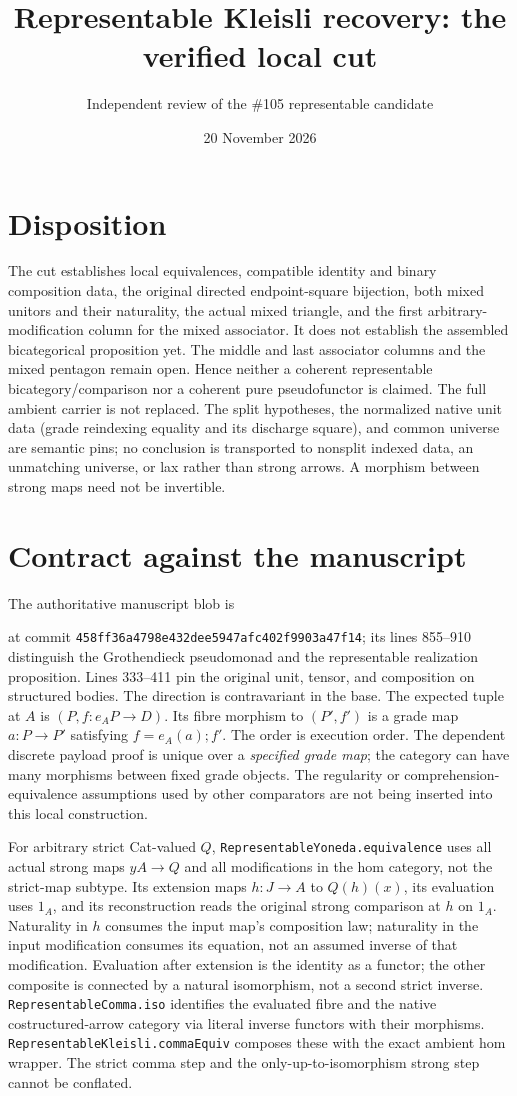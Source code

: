 \documentclass[11pt]{article}
\title{Representable Kleisli recovery: the verified local cut}
\author{Independent review of the \#105 representable candidate}
\date{20 November 2026}
\newcommand{\nm}[1]{\nolinkurl{#1}}
\newcommand{\hash}[1]{\par\noindent{\footnotesize\ttfamily #1}\par}
\begin{document}
\maketitle
\section*{Disposition}
The cut establishes local equivalences, compatible identity and binary
composition data, the original directed endpoint-square bijection,
both mixed unitors and their naturality, the actual mixed triangle, and
the first arbitrary-modification column for the mixed associator. It does
not establish the assembled bicategorical proposition yet. The middle and
last associator columns and the mixed pentagon remain open. Hence neither
a coherent representable bicategory/comparison nor a coherent pure
pseudofunctor is claimed. The full ambient carrier is not replaced.
The split hypotheses, the normalized native unit data (grade reindexing equality and its discharge square), and common universe are semantic pins; no conclusion
is transported to nonsplit indexed data, an unmatching universe, or
lax rather than strong arrows. A morphism between strong maps need not
be invertible.

\section*{Contract against the manuscript}
The authoritative manuscript blob is
\hash{b1e84592f59558c851faabb5291d7392d2b2f908}
at commit \nm{458ff36a4798e432dee5947afc402f9903a47f14}; its lines
855--910 distinguish the Grothendieck pseudomonad and the representable
realization proposition. Lines 333--411 pin the original unit, tensor,
and composition on structured bodies. The direction is contravariant in the base.
The expected tuple at $A$ is $(P,f:e_AP\to D)$. Its fibre morphism to
$(P',f')$ is a grade map $a:P\to P'$ satisfying
$f=e_A(a);f'$. The order is execution order. The dependent discrete
payload proof is unique over a \emph{specified grade map}; the category
can have many morphisms between fixed grade objects. The regularity
or comprehension-equivalence assumptions used by other comparators are
not being inserted into this local construction.

For arbitrary strict Cat-valued $Q$, \nm{RepresentableYoneda.equivalence}
uses all actual strong maps $yA\to Q$ and all modifications in the hom
category, not the strict-map subtype. Its extension maps $h:J\to A$
to $Q(h)(x)$, its evaluation uses $1_A$, and its reconstruction reads
the original strong comparison at $h$ on $1_A$. Naturality in $h$ consumes
the input map's composition law; naturality in the input modification
consumes its equation, not an assumed inverse of that modification.
Evaluation after extension is the identity as a functor; the other
composite is connected by a natural isomorphism, not a second strict
inverse. \nm{RepresentableComma.iso} identifies the evaluated fibre and
the native costructured-arrow category via literal inverse functors
with their morphisms. \nm{RepresentableKleisli.commaEquiv} composes
these with the exact ambient hom wrapper. The strict comma step and the
only-up-to-isomorphism strong step cannot be conflated.
\end{document}
